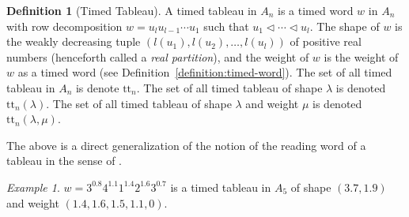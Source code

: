 \documentclass[10pt]{amsproc}
\theoremstyle{definition}
\newtheorem{definition}[theorem]{Definition}
\theoremstyle{remark}
\newtheorem{example}[theorem]{Example}
\newcommand{\ttab}{\mathrm{tt}}
\begin{document}
\begin{definition}[Timed Tableau]\label{definition:timed-tableau}
  A timed tableau in $A_n$ is a timed word $w$ in $A_n$ with row decomposition $w=u_l u_{l-1}\dotsb u_1$ such that $u_1\lhd \dotsb \lhd u_l$.
  The shape of $w$ is the weakly decreasing tuple $(l(u_1),l(u_2),\dotsc,l(u_l))$ of positive real numbers (henceforth called a \emph{real partition}), and the weight of $w$ is the weight of $w$ as a timed word (see Definition~\ref{definition:timed-word}).
  The set of all timed tableau in $A_n$ is denote $\ttab_n$.
  The set of all timed tableau of shape $\lambda$ is denoted $\ttab_n(\lambda)$.
  The set of all timed tableau of shape $\lambda$ and weight $\mu$ is denoted $\ttab_n(\lambda,\mu)$.
\end{definition}
The above is a direct generalization of the notion of the reading word of a tableau in the sense of \cite{Lascoux}.
\begin{example}
  \label{example:timed-tableau}
  $w=3^{0.8}4^{1.1}1^{1.4}2^{1.6}3^{0.7}$ is a timed tableau in $A_5$ of shape $(3.7,1.9)$ and weight $(1.4, 1.6, 1.5, 1.1,0)$.
\end{example}
\end{document}
